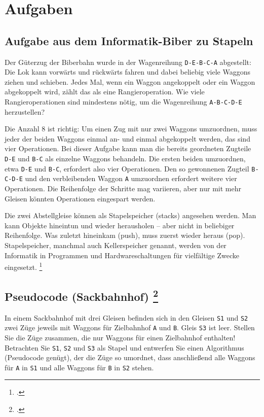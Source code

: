 \documentclass{lehramt-informatik-haupt}
\begin{document}
\chapter{Aufgaben}

\section{Aufgabe aus dem Informatik-Biber zu Stapeln}

Der Güterzug der Biberbahn wurde in der Wagenreihung \verb|D-E-B-C-A|
abgestellt: Die Lok kann vorwärts und rückwärts fahren und dabei
beliebig viele Waggons ziehen und schieben. Jedes Mal, wenn ein Waggon
angekoppelt oder ein Waggon abgekoppelt wird, zählt das als eine
Rangieroperation. Wie viele Rangieroperationen sind mindestens nötig, um
die Wagenreihung \verb|A-B-C-D-E| herzustellen?

Die Anzahl 8 ist richtig: Um einen Zug mit nur zwei Waggons umzuordnen,
muss jeder der beiden Waggons einmal an- und einmal abgekoppelt werden,
das sind vier Operationen. Bei dieser Aufgabe kann man die bereits
geordneten Zugteile \verb|D-E| und \verb|B-C| als einzelne Waggons
behandeln. Die ersten beiden umzuordnen, etwa \verb|D-E| und \verb|B-C|,
erfordert also vier Operationen. Den so gewonnenen Zugteil
\verb|B-C-D-E| und den verbleibenden Waggon \verb|A| umzuordnen
erfordert weitere vier Operationen. Die Reihenfolge der Schritte mag
variieren, aber nur mit mehr Gleisen könnten Operationen eingespart
werden.

Die zwei Abstellgleise können als Stapelspeicher (stacks) angesehen
werden. Man kann Objekte hineintun und wieder herausholen – aber nicht
in beliebiger Reihenfolge. Was zuletzt hineinkam (push), muss zuerst
wieder heraus (pop). Stapelspeicher, manchmal auch Kellerspeicher
genannt, werden von der Informatik in Programmen und Hardwareschaltungen
für vielfältige Zwecke eingesetzt.
\footcite[Seite 23]{net:pdf:informatik-biber-2012}

%

\section{Pseudocode (Sackbahnhof)
\footcite[Seite 3, Aufgabe 4: Stack]{aud:ab:7}}

In einem Sackbahnhof mit drei Gleisen befinden sich in den Gleisen
\texttt{S1} und \texttt{S2} zwei Züge jeweils mit Waggons für
Zielbahnhof \texttt{A} und \texttt{B}. Gleis \texttt{S3} ist leer.
Stellen Sie die Züge zusammen, die nur Waggons für einen Zielbahnhof
enthalten! Betrachten Sie \texttt{S1}, \texttt{S2} und \texttt{S3} als
Stapel und entwerfen Sie einen Algorithmus (Pseudocode genügt), der die
Züge so umordnet, dass anschließend alle Waggons für \texttt{A} in
\texttt{S1} und alle Waggons für \texttt{B} in \texttt{S2} stehen.
\end{document}
